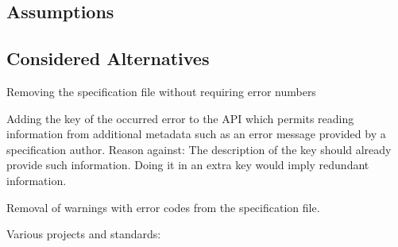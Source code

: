 \subsection*{Assumptions}

\subsection*{Considered Alternatives}


\begin{DoxyItemize}
\item Removing the specification file without requiring error numbers
\item Adding the key of the occurred error to the A\+PI which permits reading information from additional metadata such as an error message provided by a specification author. Reason against\+: The description of the key should already provide such information. Doing it in an extra key would imply redundant information.
\item Removal of warnings with error codes from the specification file.
\end{DoxyItemize}

Various projects and standards\+:


